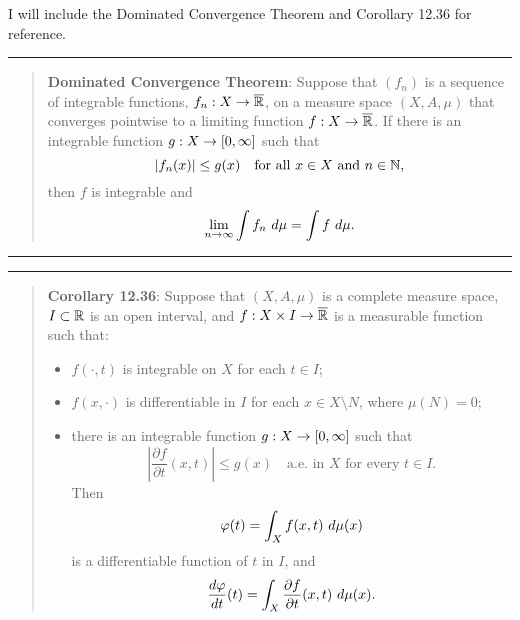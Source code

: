 \begin{solution}

    I will include the Dominated Convergence Theorem and Corollary 12.36 for reference.

    \begin{center}\rule{16.5cm}{0.5pt}\end{center}
    \begin{quote}
    \vspace{-6mm}
        \textbf{Dominated Convergence Theorem}: Suppose that $(f_n)$ is a sequence of integrable functions, $f_n: X \rightarrow \overline{\mathbb{R}}$, on a measure space $(X, A, \mu)$ that converges pointwise to a limiting function $f: X \rightarrow \overline{\mathbb{R}}$. If there is an integrable function $g: X \rightarrow [0, \infty]$ such that
        \[|f_n(x)| \leq g(x) \quad \text{for all $x \in X$ and $n \in \mathbb{N}$},\]
        then $f$ is integrable and 
        \[\lim_{n \rightarrow \infty} \int f_n \ d\mu = \int f \ d\mu.\]
    \end{quote}
    \vspace{-10mm}
    \begin{center}\rule{16.5cm}{0.5pt}\end{center}
    \jump

    \begin{center}\rule{16.5cm}{0.5pt}\end{center}
    \begin{quote}
    \vspace{-6mm}
        \textbf{Corollary 12.36}: Suppose that $(X, A , \mu)$ is a complete measure space, $I \subset \mathbb{R}$ is an open interval, and $f : X \times I \rightarrow \overline{\mathbb{R}}$ is a measurable function such that:
        \begin{itemize}
            \item $f(\cdot, t)$ is integrable on $X$ for each $t \in I$;
            \item $f(x, \cdot)$ is differentiable in $I$ for each $x \in X \setminus N$, where $\mu(N) = 0$;
            \item there is an integrable function $g: X \rightarrow [0, \infty]$ such that 
            \[ \left| \frac{\partial f}{\partial t}(x, t) \right| \leq g(x) \quad \text{a.e. in $X$ for every $t \in I$.}\]
            Then
            \[\ph (t) = \int_X f(x, t) \ d\mu(x)\]
            is a differentiable function of $t$ in $I$, and 
            \[\frac{d\varphi}{dt} (t) = \int_X \frac{\partial f}{\partial t}(x, t) \ d\mu(x).\]
        \end{itemize}
        

\end{quote}
\end{solution}
